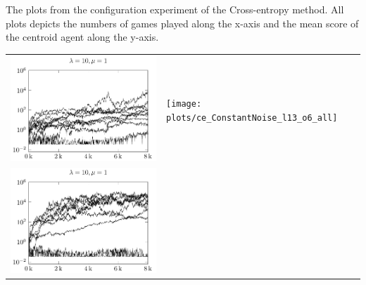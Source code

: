 The plots from the configuration experiment of the Cross-entropy method.
All plots depicts the numbers of games played along the x-axis
and the mean score of the centroid agent along the y-axis.

\begin{tabular}{@{}l@{}l@{}}
\includegraphics[scale=1]{plots/ce_ConstantNoise_l10_o1_all} &
\texttt{[image: plots/ce\_ConstantNoise\_l13\_o6\_all]} \\
\includegraphics[scale=1]{plots/ce_ConstantNoise_l10_o5_all} &
\end{tabular}


